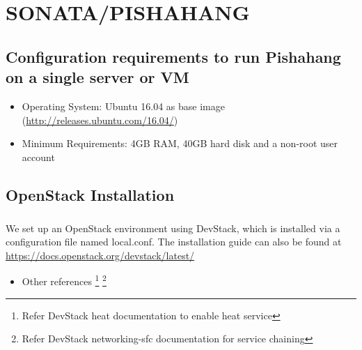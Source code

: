 \chapter{SONATA/PISHAHANG}
\label{ch:pishahang}

	\section{Configuration requirements to run Pishahang on a single server or VM}
	\label{sec:Configuration requirements to run Pishahang on a single server or VM}
	\begin{itemize}
		\item Operating System: Ubuntu 16.04 as base image (\hyperlink{name}{http://releases.ubuntu.com/16.04/})
		\item Minimum Requirements: 4GB RAM, 40GB hard disk and a non-root user account
	\end{itemize}
	
	
	\section{OpenStack Installation}
	\label{OpenStack Installation}
	\paragraph{}
	We set up an OpenStack environment using DevStack, which is installed via a configuration file named local.conf. The installation guide can also be found at\\ \hyperlink{name}{https://docs.openstack.org/devstack/latest/} 
	
	\begin{itemize}
		\item Other references 
		\footnote{Refer DevStack heat documentation to enable heat service}
		\footnote{Refer DevStack networking-sfc documentation for service chaining}
	\end{itemize}
	
